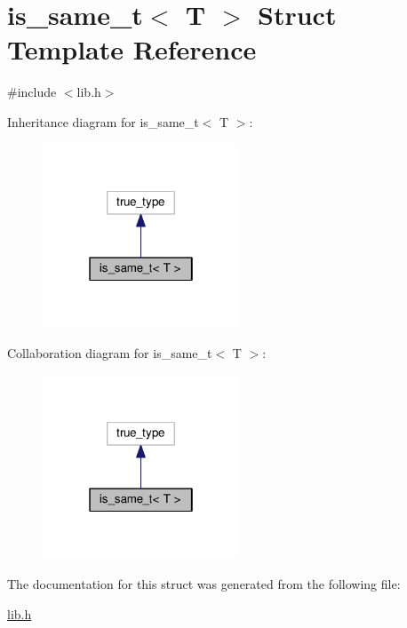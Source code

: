 \hypertarget{structis__same__t_3_01T_01_4}{\section{is\-\_\-same\-\_\-t$<$ T $>$ Struct Template Reference}
\label{structis__same__t_3_01T_01_4}
}


{\ttfamily \#include $<$lib.\-h$>$}



Inheritance diagram for is\-\_\-same\-\_\-t$<$ T $>$\-:
\nopagebreak
\begin{figure}[H]
\begin{center}
\leavevmode
\includegraphics[width=166pt]{structis__same__t_3_01T_01_4__inherit__graph}
\end{center}
\end{figure}


Collaboration diagram for is\-\_\-same\-\_\-t$<$ T $>$\-:
\nopagebreak
\begin{figure}[H]
\begin{center}
\leavevmode
\includegraphics[width=166pt]{structis__same__t_3_01T_01_4__coll__graph}
\end{center}
\end{figure}


The documentation for this struct was generated from the following file\-:\begin{DoxyCompactItemize}
\item 
\hyperlink{lib_8h}{lib.\-h}\end{DoxyCompactItemize}
